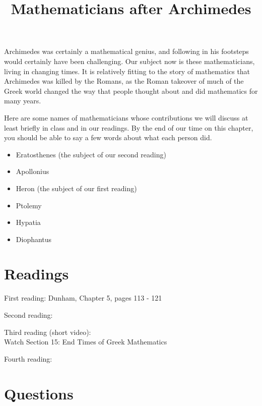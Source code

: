 \documentclass[nooutcomes]{ximera}
\title{Mathematicians after Archimedes}
\begin{document}
\begin{abstract}
    
\end{abstract}
\maketitle

Archimedes was certainly a mathematical genius, and following in his footsteps would certainly have been challenging.  Our subject now is these mathematicians, living in changing times.  It is relatively fitting to the story of mathematics that Archimedes was killed by the Romans, as the Roman takeover of much of the Greek world changed the way that people thought about and did mathematics for many years.

Here are some names of mathematicians whose contributions we will discuss at least briefly in class and in our readings.  By the end of our time on this chapter, you should be able to say a few words about what each person did.
\begin{itemize}
\item Eratosthenes (the subject of our second reading)
\item Apollonius
\item Heron (the subject of our first reading)
\item Ptolemy
\item Hypatia
\item Diophantus
\end{itemize}




\section{Readings}
First reading: Dunham, Chapter 5, pages 113 - 121 

Second reading: 

Third reading (short video):  \\ Watch Section 15: End Times of Greek Mathematics

Fourth reading: 

\section{Questions}
\end{document}
